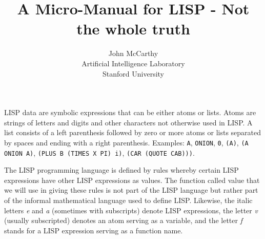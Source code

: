\documentclass[10pt,a4paper,twocolumn]{article}
\title{A Micro-Manual for LISP - Not the whole truth}
\author{John McCarthy\\
  Artificial Intelligence Laboratory\\
  Stanford University}
\date{}
\begin{document}
\maketitle


LISP data are symbolic expressions that can be either atoms or lists. Atoms are
strings of letters and digits and other characters not otherwise used in LISP. A
list consists of a left parenthesis followed by zero or more atoms or lists
separated by spaces and ending with a right parenthesis. Examples: \texttt{A},
\texttt{ONION}, \texttt{0}, \texttt{(A)}, \texttt{(A ONION A)}, \texttt{(PLUS B
  (TIMES X PI) i)}, \texttt{(CAR (QUOTE CAB)))}.

The LISP programming language is defined by rules whereby certain LISP
expressions have other LISP expressions as values. The function called value
that we will use in giving these rules is not part of the LISP language but
rather part of the informal mathematical language used to define LISP. Likewise,
the italic letters \textit{e} and \textit{a} (sometimes with subscripts) denote
LISP expressions, the letter \textit{v} (usually subscripted) denotes an atom
serving as a variable, and the letter \textit{f} stands for a LISP expression
serving as a function name.
\end{document}
